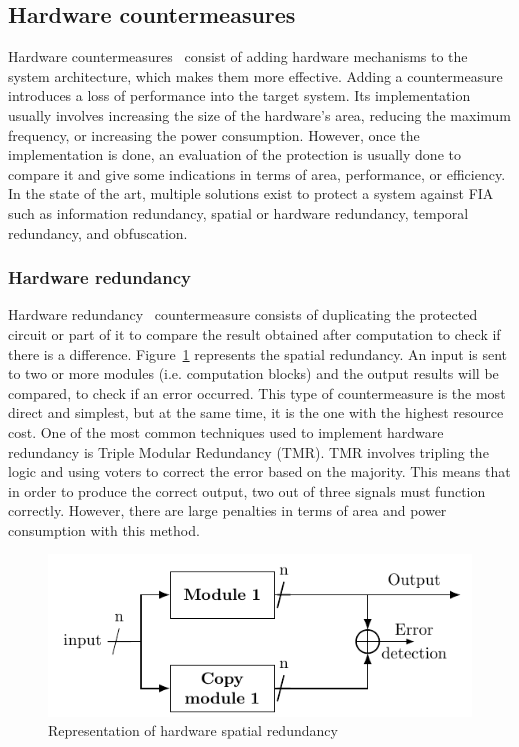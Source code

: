 \subsection{Hardware countermeasures}
Hardware countermeasures~\cite{BCNTW-06-procieee, PTAJC-22-appSci} consist of adding hardware mechanisms to the system architecture, which makes them more effective. Adding a countermeasure introduces a loss of performance into the target system. Its implementation usually involves increasing the size of the hardware's area, reducing the maximum frequency, or increasing the power consumption. However, once the implementation is done, an evaluation of the protection is usually done to compare it and give some indications in terms of area, performance, or efficiency.
In the state of the art, multiple solutions exist to protect a system against FIA such as information redundancy, spatial or hardware redundancy, temporal redundancy, and obfuscation.

\subsubsection{Hardware redundancy}
Hardware redundancy~\cite{JMR-07-iet, DFR-07-dsn, NDFR-08-ets} countermeasure consists of duplicating the protected circuit or part of it to compare the result obtained after computation to check if there is a difference. Figure~\ref{fig:spatial_redundancy} represents the spatial redundancy. An input is sent to two or more modules (i.e. computation blocks) and the output results will be compared, to check if an error occurred.
This type of countermeasure is the most direct and simplest, but at the same time, it is the one with the highest resource cost.
One of the most common techniques used to implement hardware redundancy is Triple Modular Redundancy (TMR). TMR involves tripling the logic and using voters to correct the error based on the majority. This means that in order to produce the correct output, two out of three signals must function correctly. However, there are large penalties in terms of area and power consumption with this method.

\begin{figure}[ht]
    \centering
    \includegraphics[page=1]{c2_soa/img/redundancy.pdf}
    \caption{Representation of hardware spatial redundancy}
    \label{fig:spatial_redundancy}
\end{figure}

